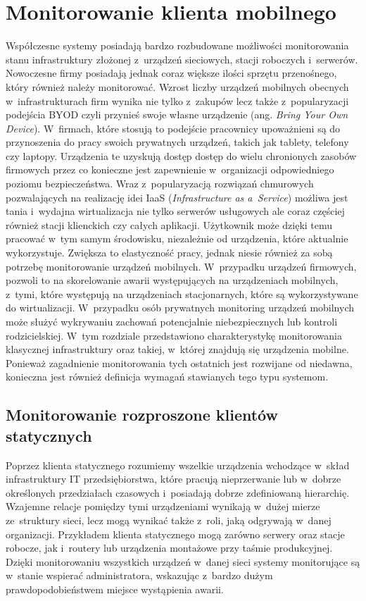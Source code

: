 \chapter{Monitorowanie klienta mobilnego}
\label{chap:Wymagania}

Współczesne systemy posiadają bardzo rozbudowane możliwości
monitorowania stanu infrastruktury złożonej z~urządzeń sieciowych,
stacji roboczych i~serwerów. Nowoczesne firmy posiadają jednak coraz
większe ilości sprzętu przenośnego, który również należy
monitorować. Wzrost liczby urządzeń mobilnych obecnych
w~infrastrukturach firm wynika nie tylko z~zakupów lecz także
z~popularyzacji podejścia BYOD czyli przynieś swoje własne urządzenie
(ang. {\em Bring Your Own Device}). W~firmach, które stosują to
podejście pracownicy upoważnieni są do przynoszenia do pracy swoich
prywatnych urządzeń, takich jak tablety, telefony czy
laptopy. Urządzenia te uzyskują dostęp dostęp do wielu chronionych
zasobów firmowych przez co konieczne jest zapewnienie w~organizacji
odpowiedniego poziomu bezpieczeństwa. Wraz z~popularyzacją rozwiązań
chmurowych pozwalających na realizację idei IaaS ({\em Infrastructure
  as a~Service}) możliwa jest tania i~wydajna wirtualizacja nie tylko
serwerów usługowych ale coraz częściej również stacji klienckich czy
całych aplikacji. Użytkownik może dzięki temu pracować w~tym samym
środowisku, niezależnie od urządzenia, które aktualnie
wykorzystuje. Zwiększa to elastyczność pracy, jednak niesie również za
sobą potrzebę monitorowanie urządzeń mobilnych. W~przypadku urządzeń
firmowych, pozwoli to na skorelowanie awarii występujących na
urządzeniach mobilnych, z~tymi, które występują na urządzeniach
stacjonarnych, które są wykorzystywane do wirtualizacji. W~przypadku
osób prywatnych monitoring urządzeń mobilnych może służyć wykrywaniu
zachowań potencjalnie niebezpiecznych lub kontroli rodzicielskiej.
W~tym rozdziale przedstawiono charakterystykę monitorowania klasycznej
infrastruktury oraz takiej, w~której znajdują się urządzenia
mobilne. Ponieważ zagadnienie monitorowania tych ostatnich jest
rozwijane od niedawna, konieczna jest również definicja wymagań
stawianych tego typu systemom.

\section[Monitorowanie rozproszone][Monitorowanie rozproszone klientów
statycznych]{Monitorowanie rozproszone klientów statycznych}

Poprzez klienta statycznego rozumiemy wszelkie urządzenia wchodzące
w~skład infrastruktury IT przedsiębiorstwa, które pracują
nieprzerwanie lub w~dobrze określonych przedziałach czasowych
i~posiadają dobrze zdefiniowaną hierarchię. Wzajemne relacje pomiędzy
tymi urządzeniami wynikają w~dużej mierze ze~struktury sieci, lecz
mogą wynikać także z~roli, jaką odgrywają w~danej
organizacji. Przykładem klienta statycznego mogą zarówno serwery oraz
stacje robocze, jak i~routery lub urządzenia montażowe przy taśmie
produkcyjnej. Dzięki monitorowaniu wszystkich urządzeń w~danej sieci
systemy monitorujące są w~stanie wspierać administratora, wskazując
z~bardzo dużym prawdopodobieństwem miejsce wystąpienia awarii.

